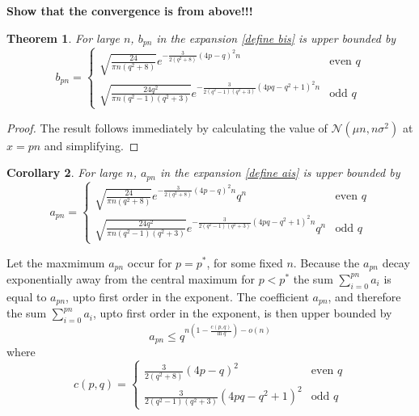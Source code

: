 \documentclass[a4paper,12pt]{article}
\newtheorem{theorem}{Theorem}
\newtheorem{corollary}[theorem]{Corollary}
\begin{document}
\textbf{Show that the convergence is from above!!!}

\begin{theorem}
    For large $n$, $b_{pn}$ in the expansion \cref{define bis} is upper bounded by
    \begin{equation}
        b_{pn} = \begin{cases}\sqrt{\frac{24}{\pi n (q^2 + 8)}} e^{-\frac{3}{2(q^2 + 8)}(4p - q)^2 n} & \text{even $q$}\\
        \sqrt{\frac{24q^2}{\pi n (q^2 - 1)(q^2 + 3)}} e^{-\frac{3}{2(q^2 - 1)(q^2 + 3)}(4pq - q^2 + 1)^2 n} & \text{odd $q$}
        \end{cases}
    \end{equation}
\end{theorem}
\begin{proof}
    The result follows immediately by calculating the value of $\mathcal{N}(\mu n, n \sigma^2)$ at $x = pn$ and simplifying.
\end{proof}

\begin{corollary}
    For large $n$, $a_{pn}$ in the expansion \cref{define ais} is upper bounded by 
    \begin{equation}
        a_{pn} = \begin{cases}\sqrt{\frac{24}{\pi n (q^2 + 8)}} e^{-\frac{3}{2(q^2 + 8)}(4p - q)^2 n} q^n & \text{even $q$}\\
        \sqrt{\frac{24q^2}{\pi n (q^2 - 1)(q^2 + 3)}} e^{-\frac{3}{2(q^2 - 1)(q^2 + 3)}(4pq - q^2 + 1)^2 n} q^n & \text{odd $q$}
        \end{cases}
    \end{equation}
\end{corollary}

Let the maxmimum $a_{pn}$ occur for $p = p^*$, for some fixed $n$. Because the $a_{pn}$ decay exponentially away from the central maximum for $p < p^*$ the sum $\sum_{i = 0}^{pn}a_i$ is equal to $a_{pn}$, upto first order in the exponent. The coefficient $a_{pn}$, and therefore the sum $\sum_{i = 0}^{pn}a_i$, upto first order in the exponent, is then upper bounded by
$$
    a_{pn} \leq q^{n\left(1- \frac{c(p,q)}{\ln q}\right) - o(n)}
$$ 
where
\begin{equation}
    c(p,q) = \begin{cases} {\frac{3}{2(q^2 + 8)}(4p - q)^2} & \text{even $q$}\\
    {\frac{3}{2(q^2 - 1)(q^2 + 3)}(4pq - q^2 + 1)^2} & \text{odd $q$}
    \end{cases}
\end{equation}
\end{document}
